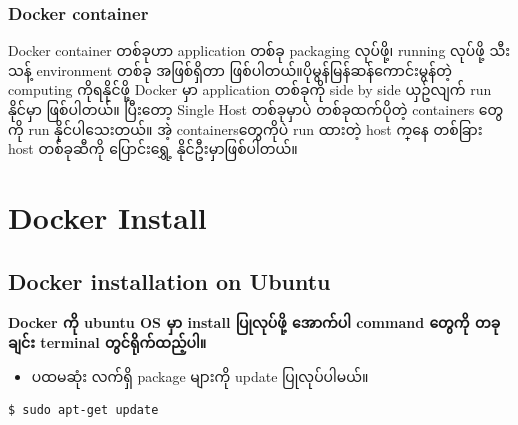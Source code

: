 \hypertarget{docker-container-3}{%
\subsubsection{Docker container}\label{docker-container-3}}

Docker container တစ်ခုဟာ application တစ်ခု packaging လုပ်ဖို့၊ running
လုပ်ဖို့ သီးသန့် environment တစ်ခု အဖြစ်​ရှိ​တာ
ဖြစ်ပါတယ်။ပိုမွန်​မြန်ဆန်​ကောင်းမွန်တဲ့ computing ကိုရနိုင်ဖို့ Docker
မှာ application တစ်ခုကို side by side ယှဥ်လျက် run နိုင်မှာ ဖြစ်ပါတယ်။
ပြီး​တော့ Single Host တစ်ခုမှာပဲ တစ်ခုထက်ပိုတဲ့ containers ​တွေကို run
နိုင်ပါ​သေးတယ်။ အဲ့ containers ​တွေကိုပဲ run ထားတဲ့ host က္​နေ တစ်ခြား
host တစ်ခုဆီကို ​ပြောင်း​​ရွှေ့ နိုင်ဦးမှာဖြစ်ပါတယ်။

\pagebreak

\hypertarget{docker-install-1}{%
\section{Docker Install}\label{docker-install-1}}

\hypertarget{docker-installation-on-ubuntu-1}{%
\subsection{Docker installation on
Ubuntu}\label{docker-installation-on-ubuntu-1}}

\textbf{Docker ကို ubuntu OS မှာ install ပြုလုပ်ဖို့ အောက်ပါ command
တွေကို တခုချင်း terminal တွင်ရိုက်ထည့်ပါ။}

\begin{itemize}
\tightlist
\item
  ပထမဆုံး လက်ရှိ package များကို update ပြုလုပ်ပါမယ်။
\end{itemize}

\begin{verbatim}
$ sudo apt-get update
\end{verbatim}

